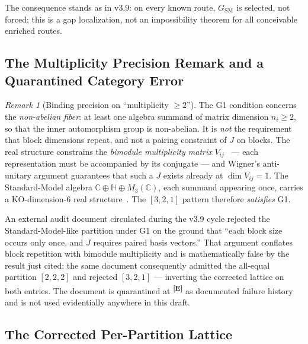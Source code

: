 \documentclass[12pt,a4paper,twoside]{article}
\theoremstyle{plain}
\theoremstyle{definition}
\theoremstyle{remark}
\newtheorem{remark}[theorem]{Remark}
\newcommand{\catmark}[1]{\textsuperscript{\textsf{\textbf{[#1]}}}}
\begin{document}
The consequence stands as in v3.9: on every known
route, $G_{\mathrm{SM}}$ is selected, not forced; this is a gap
localization, not an impossibility theorem for all conceivable enriched
routes.

\subsection{The Multiplicity Precision Remark and a Quarantined Category Error}
\label{subsec:multiplicity-precision}

\begin{remark}[Binding precision on ``multiplicity $\geq 2$'']
\label{rem:multiplicity}
The G1 condition concerns the \emph{non-abelian fiber}: at least one
algebra summand of matrix dimension $n_i \geq 2$, so that the inner
automorphism group is non-abelian. It is \emph{not} the requirement that
block dimensions repeat, and not a pairing constraint of $J$ on blocks.
The real structure constrains the \emph{bimodule multiplicity matrix}
$V_{ij}$~\cite{krajewski1998,paschkesitarz1998,cacic2011} --- each representation must be accompanied by its conjugate ---
and Wigner's anti-unitary argument guarantees that such a $J$ exists
already at $\dim V_{ij} = 1$. The Standard-Model algebra
$\mathbb C \oplus \mathbb H \oplus M_3(\mathbb C)$, each summand appearing
once, carries a KO-dimension-6 real structure~\cite{ccm2007,vansuijlekom2019}. The $[3,2,1]$ pattern
therefore \emph{satisfies} G1.
\end{remark}

An external audit document circulated during the v3.9 cycle rejected the
Standard-Model-like partition under G1 on the ground that ``each block
size occurs only once, and $J$ requires paired basis vectors.'' That
argument conflates block repetition with bimodule multiplicity and is
mathematically false by the result just cited; the same document
consequently admitted the all-equal partition $[2,2,2]$ and rejected
$[3,2,1]$ --- inverting the corrected lattice on both entries. The
document is quarantined at \catmark{E} as documented failure history and
is not used evidentially anywhere in this draft.

\subsection{The Corrected Per-Partition Lattice}
\label{subsec:corrected-lattice}
\end{document}

